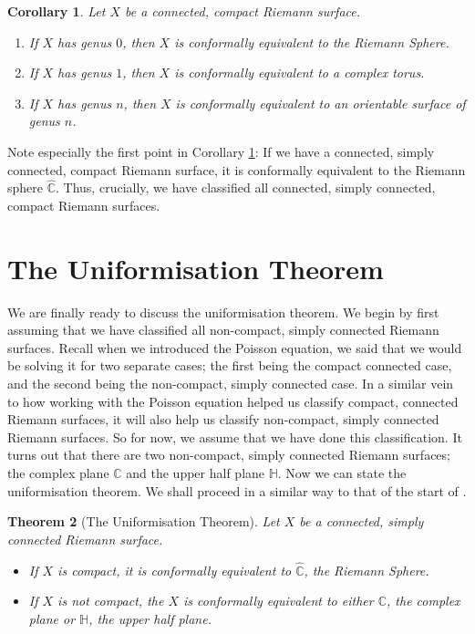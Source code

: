 \documentclass[11pt]{report}
\newtheorem{thm}{Theorem}[section]
\newtheorem{cor}[thm]{Corollary}
\theoremstyle{definition}
\begin{document}
\begin{cor}\label{ClassificationByGenus}
  Let $X$ be a connected, compact Riemann surface. 
  \begin{enumerate}
    \item If $X$ has genus $0$, then $X$ is conformally equivalent to the Riemann Sphere. 
    \item If $X$ has genus $1$, then $X$ is conformally equivalent to a complex torus.
    \item If $X$ has genus $n$, then $X$ is conformally equivalent to an orientable surface of genus $n$.
  \end{enumerate}
\end{cor}
Note especially the first point in Corollary \ref{ClassificationByGenus}: If we have a connected, simply connected, compact Riemann surface, it is conformally equivalent to the Riemann sphere $\widehat{\mathbb{C}}$. Thus, crucially, we have classified all connected, simply connected, compact Riemann surfaces.

\section{The Uniformisation Theorem}
We are finally ready to discuss the uniformisation theorem. We begin by first assuming that we have classified all non-compact, simply connected Riemann surfaces. Recall when we introduced the Poisson equation, we said that we would be solving it for two separate cases; the first being the compact connected case, and the second being the non-compact, simply connected case. In a similar vein to how working with the Poisson equation helped us classify compact, connected Riemann surfaces, it will also help us classify non-compact, simply connected Riemann surfaces. So for now, we assume that we have done this classification. It turns out that there are two non-compact, simply connected Riemann surfaces; the complex plane $\mathbb{C}$ and the upper half plane $\mathbb{H}$.
Now we can state the uniformisation theorem. We shall proceed in a similar way to that of the start of \cite[(Chapter 10)]{donaldson}.

\begin{thm}[The Uniformisation Theorem]\label{Uniformisation}
  Let $X$ be a connected, simply connected Riemann surface. 
  \begin{itemize}
    \item If $X$ is compact, it is conformally equivalent to $\widehat{\mathbb{C}}$, the Riemann Sphere. 
    \item If $X$ is not compact, the $X$ is conformally equivalent to either $\mathbb{C}$, the complex plane or $\mathbb{H}$, the upper half plane.
  \end{itemize}
\end{thm}
\end{document}

